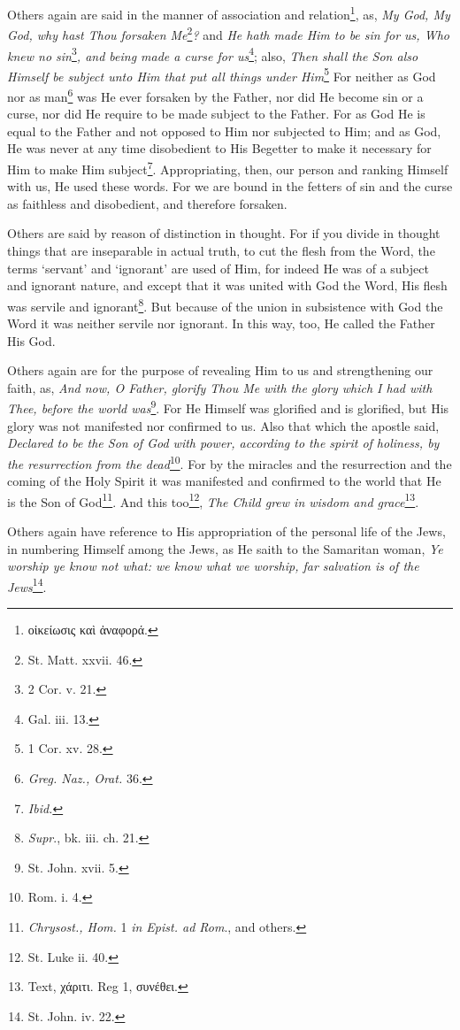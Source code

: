 Others again are said in the manner of association and relation\footnote{\textgreek{οἰκείωσις καὶ ἀναφορά}.}, as, \emph{My God, My God, why hast Thou forsaken Me}\footnote{St. Matt. xxvii. 46.}\emph{? }and \emph{He hath made Him to be sin for us, Who knew no sin}\footnote{2 Cor. v. 21.}\emph{, and being made a curse for us}\footnote{Gal. iii. 13.}; also, \emph{Then shall the Son also Himself be subject unto Him that put all things under Him}\footnote{1 Cor. xv. 28.} For neither as God nor as man\footnote{\emph{Greg. Naz., Orat. }36.} was He ever forsaken by the Father, nor did He become sin or a curse, nor did He require to be made subject to the Father. For as God He is equal to the Father and not opposed to Him nor subjected to Him; and as God, He was never at any time disobedient to His Begetter to make it necessary for Him to make Him subject\footnote{\emph{Ibid.}}. Appropriating, then, our person and ranking Himself with us, He used these words. For we are bound in the fetters of sin and the curse as faithless and disobedient, and therefore forsaken.

Others are said by reason of distinction in thought. For if you divide in thought things that are inseparable in actual truth, to cut the flesh from the Word, the terms  ‘servant’ and ‘ignorant’ are used of Him, for indeed He was of a subject and ignorant nature, and except that it was united with God the Word, His flesh was servile and ignorant\footnote{\emph{Supr}., bk. iii. ch. 21.}. But because of the union in subsistence with God the Word it was neither servile nor ignorant. In this way, too, He called the Father His God.

Others again are for the purpose of revealing Him to us and strengthening our faith, as, \emph{And now, O Father, glorify Thou Me with the glory which I had with Thee, before the world was}\footnote{St. John. xvii. 5.}. For He Himself was glorified and is glorified, but His glory was not manifested nor confirmed to us. Also that which the apostle said, \emph{Declared to be the Son of God with power, according to the spirit of holiness, by the resurrection from the dead}\footnote{Rom. i. 4.}. For by the miracles and the resurrection and the coming of the Holy Spirit it was manifested and confirmed to the world that He is the Son of God\footnote{\emph{Chrysost., Hom. }1 \emph{in Epist. ad Rom}., and others.}. And this too\footnote{St. Luke ii. 40.}, \emph{The Child grew in wisdom and grace}\footnote{Text, \textgreek{χάριτι}. Reg 1, \textgreek{συνέθει}.}.

Others again have reference to His appropriation of the personal life of the Jews, in numbering Himself among the Jews, as He saith to the Samaritan woman, \emph{Ye worship ye know not what: we know what we worship, far salvation is of the Jews}\footnote{St. John. iv. 22.}.

